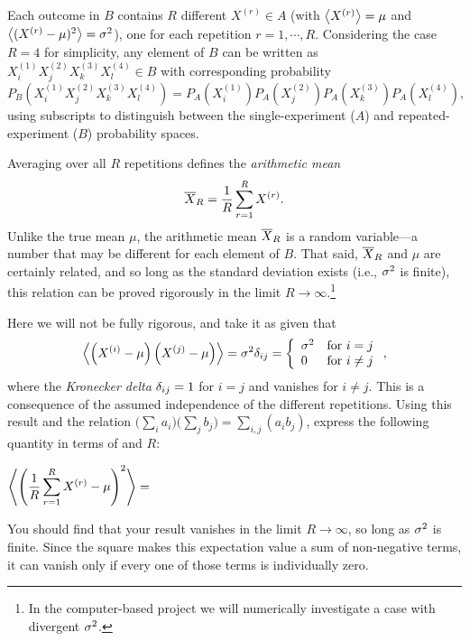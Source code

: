 Each outcome in $B$ contains $R$ different $X^{(r)} \in A$ (with $\left\langle X^{(r)} \right\rangle = \mu$ and $\left\langle (X^{(r)} - \mu)^2 \right\rangle = \sigma^2$), one for each repetition $r = 1, \cdots, R$.
Considering the case $R = 4$ for simplicity, any element of $B$ can be written as $X_i^{(1)} X_j^{(2)} X_k^{(3)} X_l^{(4)} \in B$ with corresponding probability
\begin{equation*}
  P_B\left(X_i^{(1)} X_j^{(2)} X_k^{(3)} X_l^{(4)}\right) = P_A\left(X_i^{(1)}\right) P_A\left(X_j^{(2)}\right) P_A\left(X_k^{(3)}\right) P_A\left(X_l^{(4)}\right),
\end{equation*}
using subscripts to distinguish between the single-experiment ($A$) and repeated-experiment ($B$) probability spaces.

Averaging over all $R$ repetitions defines the \textit{arithmetic mean}
\begin{equation}
  \label{eq:ave}
  \overline X_R = \frac{1}{R} \sum_{r = 1}^R X^{(r)}.
\end{equation}
Unlike the true mean $\mu$, the arithmetic mean $\overline X_R$ is a random variable---a number that may be different for each element of $B$.
That said, $\overline X_R$ and $\mu$ are certainly related, and so long as the standard deviation exists (i.e., $\sigma^2$ is finite), this relation can be proved rigorously in the limit $R \to \infty$.\footnote{In the computer-based project we will numerically investigate a case with divergent $\sigma^2$.}

Here we will not be fully rigorous, and take it as given that
\begin{equation*}
  \left\langle \left(X^{(i)} - \mu\right)\left(X^{(j)} - \mu\right) \right\rangle = \sigma^2 \delta_{ij} = \left\{\begin{array}{ll}\sigma^2 & \mbox{for } i = j \\ 0 & \mbox{for } i \ne j\end{array}\right.,
\end{equation*}
where the \textit{Kronecker delta} $\delta_{ij} = 1$ for $i = j$ and vanishes for $i \ne j$.
This is a consequence of the assumed independence of the different repetitions.
Using this result and the relation $\big(\sum_i a_i\big)\big(\sum_j b_j\big) = \sum_{i, j} \left(a_i b_j\right)$, express the following quantity in terms of \si and $R$:
\begin{mdframed}
  $\displaystyle \left\langle \left(\frac{1}{R} \sum_{r = 1}^R X^{(r)} - \mu\right)^2 \right\rangle = $ \\[100 pt]
\end{mdframed}
You should find that your result vanishes in the limit $R \to \infty$, so long as $\sigma^2$ is finite.
Since the square makes this expectation value a sum of non-negative terms, it can vanish only if every one of those terms is individually zero.


